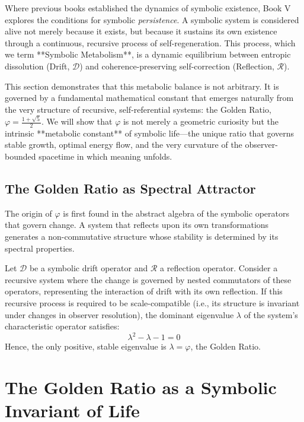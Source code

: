 Where previous books established the dynamics of symbolic existence, Book V explores the conditions for symbolic \emph{persistence}. A symbolic system is considered alive not merely because it exists, but because it sustains its own existence through a continuous, recursive process of self-regeneration. This process, which we term **Symbolic Metabolism**, is a dynamic equilibrium between entropic dissolution (Drift, $\mathcal{D}$) and coherence-preserving self-correction (Reflection, $\mathcal{R}$).

This section demonstrates that this metabolic balance is not arbitrary. It is governed by a fundamental mathematical constant that emerges naturally from the very structure of recursive, self-referential systems: the Golden Ratio, $\varphi = \frac{1 + \sqrt{5}}{2}$. We will show that $\varphi$ is not merely a geometric curiosity but the intrinsic **metabolic constant** of symbolic life—the unique ratio that governs stable growth, optimal energy flow, and the very curvature of the observer-bounded spacetime in which meaning unfolds.

\subsection{The Golden Ratio as Spectral Attractor}
\label{subsec:bk5_golden_ratio_spectral_attractor}

The origin of $\varphi$ is first found in the abstract algebra of the symbolic operators that govern change. A system that reflects upon its own transformations generates a non-commutative structure whose stability is determined by its spectral properties.

\begin{theorem}
\label{theorem:bk5_golden_ratio_spectral_invariant}
Let $\mathcal{D}$ be a symbolic drift operator and $\mathcal{R}$ a reflection operator. Consider a recursive system where the change is governed by nested commutators of these operators, representing the interaction of drift with its own reflection. If this recursive process is required to be scale-compatible (i.e., its structure is invariant under changes in observer resolution), the dominant eigenvalue $\lambda$ of the system's characteristic operator satisfies:
\[
\lambda^2 - \lambda - 1 = 0
\]
Hence, the only positive, stable eigenvalue is $\lambda = \varphi$, the Golden Ratio.
\end{theorem}

\section{The Golden Ratio as a Symbolic Invariant of Life}
\label{sec:bk5_golden_ratio_invariant}

